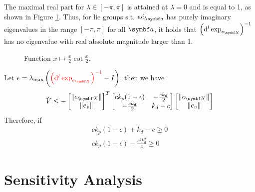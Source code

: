 The maximal real part for $\lambda \in [-\pi, \pi]$ is attained at $\lambda = 0$ and is equal to 1, as shown in Figure \ref{fig:cot_fcn}. Thus, for lie groups s.t. $\ad_\a$ has purely imaginary eigenvalues in the range $[-\pi, \pi]$ for all $\a$, it holds that $\left( \mathrm{d}^l \exp_{e_\X} \right)^{-1}$ has no eigenvalue with real absolute magnitude larger than 1.

\begin{figure}
  \begin{center}
  \end{center}
  \caption{Function $x \mapsto \frac{x}{2} \cot \frac{x}{2}$.}
  \label{fig:cot_fcn}
\end{figure}

Let $\epsilon = \lambda_\textrm{max} \left( \textcolor{red}{\left(\mathrm{d}^l \exp_{e_\X} \right)^{-1}} - I \right)$; then we have
\begin{equation}
  \dot V \leq -\begin{bmatrix} \| e_\X \| \\ \| e_v \| \end{bmatrix}^T \begin{bmatrix} c k_p (1 - \epsilon) & -\frac{c k_d}{2} \\ -\frac{c k_d}{2} & k_d - c \end{bmatrix} \begin{bmatrix} \| e_\X \| \\ \| e_v \| \end{bmatrix}
\end{equation}
Therefore, if
\begin{equation}
  \begin{aligned}
    c k_p (1 - \epsilon) + k_d - c \geq 0 \\
    c k_p (1 - \epsilon) - \frac{c^2 k_d^2}{4}  \geq 0
  \end{aligned}
\end{equation}


\section{Sensitivity Analysis}

